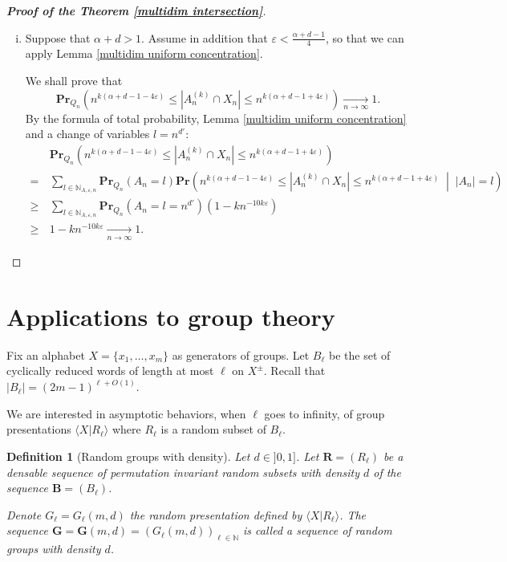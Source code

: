 \documentclass{article}
\newcommand{\bs}{\boldsymbol}
\newcommand{\tendvers}{\xrightarrow[n\to\infty]{}}
\def\Pr{\mathbf{Pr}}
\newcommand\Cond[2]{\left( #1 \;\middle|\; #2 \right)}
\newtheorem{defi}[thm]{Definition}
\theoremstyle{remark}
\begin{document}
\begin{proof}[\textbf{Proof of the Theorem \ref{multidim intersection}}]
\begin{enumerate}[(i)]
    \item Suppose that $\alpha+d>1$. Assume in addition that $\varepsilon < \frac{\alpha+d-1}{4}$, so that we can apply Lemma \ref{multidim uniform concentration}.
    
    We shall prove that
    \[\Pr_{Q_n}\left(n^{k(\alpha + d -1 - 4\varepsilon)} \leq |A_n^{(k)}\cap X_n| \leq n^{k(\alpha + d -1 + 4\varepsilon)}\right)\tendvers 1.\]
    By the formula of total probability, Lemma \ref{multidim uniform concentration} and a change of variables $l=n^{d'}$:
    \begin{align*}
        & \Pr_{Q_n}\left(n^{k(\alpha + d -1 - 4\varepsilon)} \leq |A_n^{(k)}\cap X_n| \leq n^{k(\alpha + d -1 + 4\varepsilon)}\right) \\ 
        =\, & \sum_{l\in \mathbb{N}_{A,\varepsilon,n}}\Pr_{Q_n}(A_n = l) \Pr\Cond{n^{k(\alpha + d -1 - 4\varepsilon)} \leq |A_n^{(k)}\cap X_n| \leq n^{k(\alpha + d -1 + 4\varepsilon)}}{|A_n| = l}\\
        \geq\, & \sum_{l\in \mathbb{N}_{A,\varepsilon,n}}\Pr_{Q_n}(A_n = l = n^{d'}) \left(1 - kn^{-10k\varepsilon}\right)\\
        \geq\, & 1 - kn^{-10k\varepsilon}\tendvers 1.
    \end{align*}
\end{enumerate}

\end{proof}


\section{Applications to group theory}

Fix an alphabet $X = \{x_1,\dots, x_m\}$ as generators of groups. Let $B_\ell$ be the set of cyclically reduced words of length at most $\ell$ on $X^\pm$. Recall that $|B_\ell| = (2m-1)^{\ell+O(1)}$.

We are interested in asymptotic behaviors, when $\ell$ goes to infinity, of group presentations $\langle X|R_\ell \rangle$ where $R_\ell$ is a random subset of $B_\ell$.\\

\begin{defi}[Random groups with density] Let $d\in ]0,1]$. Let $\bs R = (R_\ell)$ be a densable sequence of permutation invariant random subsets with density $d$ of the sequence $\bs B = (B_\ell)$.

Denote $G_\ell = G_\ell(m,d)$ the random presentation defined by $\langle X | R_\ell \rangle$. The sequence $\bs G = \bs G(m,d) = (G_\ell(m,d))_{\ell \in \mathbb{N}}$ is called a sequence of random groups with density $d$.
\end{defi}
\end{document}
